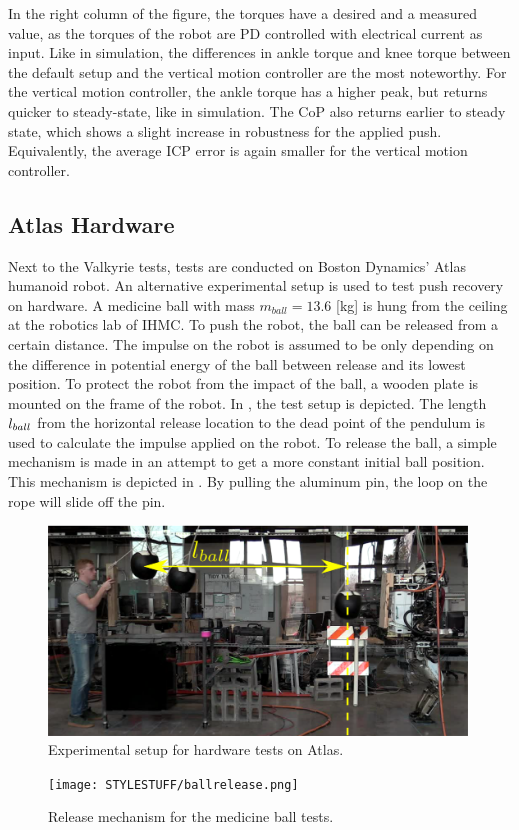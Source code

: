 In the right column of the figure, the torques have a desired and a measured value, as the torques of the robot are PD controlled with electrical current as input. Like in simulation, the differences in ankle torque and knee torque between the default setup and the vertical motion controller are the most noteworthy. For the vertical motion controller, the ankle torque has a higher peak, but returns quicker to steady-state, like in simulation.  The \ac{CoP} also returns earlier to steady state, which shows a slight increase in robustness for the applied push. Equivalently, the average \ac{ICP} error is again smaller for the vertical motion controller.

\subsection{Atlas Hardware}
Next to the Valkyrie tests, tests are conducted on Boston Dynamics' Atlas humanoid robot. An alternative experimental setup is used to test push recovery on hardware. A medicine ball with mass $m_{ball}=13.6$ [kg] is hung from the ceiling at the robotics lab of \ac{IHMC}. To push the robot, the ball can be released from a certain distance. The impulse on the robot is assumed to be only depending on the difference in potential energy of the ball between release and its lowest position. To protect the robot from the impact of the ball, a wooden plate is mounted on the frame of the robot. In , the test setup is depicted. The length $l_{ball}$ from the horizontal release location to the dead point of the pendulum is used to calculate the impulse applied on the robot. To release the ball, a simple mechanism is made in an attempt to get a more constant initial ball position. This mechanism is depicted in . By pulling the aluminum pin, the loop on the rope will slide off the pin.
\begin{figure}
\centering
\includegraphics[width=0.99\textwidth]{STYLESTUFF/atlassetup.png}
\caption{Experimental setup for hardware tests on Atlas.}
\label{fig:atlassetup}
\end{figure}
\begin{figure}
\centering
\texttt{[image: STYLESTUFF/ballrelease.png]}
\caption{Release mechanism for the medicine ball tests.}
\label{fig:ballrelease}
\end{figure}

